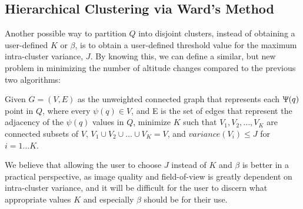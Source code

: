 \documentclass[conference]{IEEEtran}
\theoremstyle{plain}%
\begin{document}
\subsection{Hierarchical Clustering via Ward's Method}
Another possible way to partition $Q$ into disjoint clusters, instead of obtaining a user-defined $K$ or $\beta$, is to obtain a user-defined threshold value for the maximum intra-cluster variance, $J$. By knowing this, we can define a similar, but new problem in minimizing the number of altitude changes compared to the previous two algorithms:

Given $G=(V,E)$ as the unweighted connected graph that represents each $\Uppsi(q)$ point in $Q$, where every $\psi(q) \in V$, and E is the set of edges that represent the adjacency of the $\psi(q)$ values in $Q$, minimize $K$ such that $V_1, V_2, ..., V_K$ are connected subsets of $V$, $V_1 \cup V_2 \cup ... \cup V_K = V$, and $variance(V_i) \leq J$ for $i = 1...K$.

We believe that allowing the user to choose $J$ instead of $K$ and $\beta$ is better in a practical perspective, as image quality and field-of-view is greatly dependent on intra-cluster variance, and it will be difficult for the user to discern what appropriate values $K$ and especially $\beta$ should be for their use.
\end{document}
